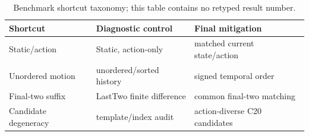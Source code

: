\begin{table}[t]\centering\scriptsize
\begin{tabular}{lll}\toprule Shortcut & Diagnostic control & Final mitigation\\\midrule
Static/action & Static, action-only & matched current state/action\\
Unordered motion & unordered/sorted history & signed temporal order\\
Final-two suffix & LastTwo finite difference & common final-two matching\\
Candidate degeneracy & template/index audit & action-diverse C20 candidates\\\bottomrule\end{tabular}
\caption{Benchmark shortcut taxonomy; this table contains no retyped result number.}\end{table}
